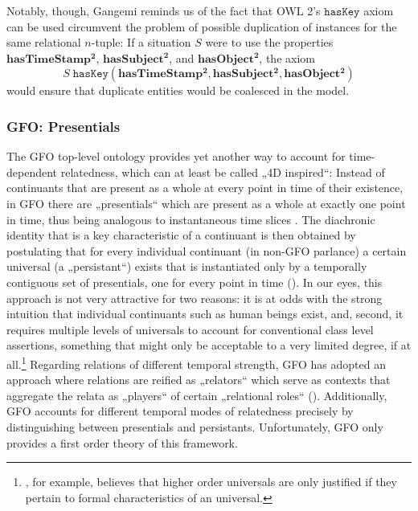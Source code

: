 \documentclass{ao2e}
\newcommand{\mirel}[1]{\ensuremath{\mathrm{\mathbf{#1}}}}
\newcommand{\mclass}[1]{\ensuremath{\mathit{#1}}}
\newcommand{\mrel}[2]{\mirel{#1^#2}}
\newcommand{\mrelb}[1]{\mrel{#1}{2}}
\begin{document}
Notably, though, Gangemi reminds us of the fact that OWL 2's $\mathtt{hasKey}$
axiom can be used circumvent the problem of possible duplication of instances
for the same relational $n$-tuple: If a situation $\mclass{S}$ were to use the properties
$\mrelb{hasTimeStamp}$, $\mrelb{hasSubject}$, and $\mrelb{hasObject}$, the axiom
\begin{equation}
\mclass{S}\;\mathtt{hasKey}(\mrelb{hasTimeStamp}, \mrelb{hasSubject},
\mrelb{hasObject})
\end{equation}
would ensure that duplicate entities would be coalesced in the model.

\subsubsection{GFO: Presentials}

The GFO top-level ontology provides yet another way to account for
time-dependent relatedness, which can at least be called „4D inspired“:
Instead of continuants that are present as a whole at every point in time
of their existence, in GFO there are „presentials“ which are present as a whole at
exactly one point in time, thus being analogous to instantaneous time slices
. The diachronic
identity that is a key characteristic of a continuant is then obtained by
postulating that for every individual continuant (in non-GFO parlance) a certain
universal (a „persistant“) exists that is instantiated only by a temporally
contiguous set of presentials, one for every point in time (\cite{GFO:ref}). In our eyes,
this approach is not very attractive for two reasons: it is at odds with the
strong intuition that individual continuants such as human beings exist, and,
second, it requires multiple levels of universals to account for conventional
class level assertions, something that might only be acceptable to a very
limited degree, if at all.\footnote{\cite{Armstrong:USR}, for example, believes that
higher order universals are only justified if they pertain to formal
characteristics of an universal.}
Regarding relations of different temporal strength, GFO has adopted an approach
where relations are reified as „relators“ which serve as contexts that aggregate
the relata as „players“ of certain „relational roles“ (\cite{Loebe:2007}). Additionally, GFO
accounts for different temporal modes of relatedness precisely by distinguishing
between presentials and persistants. Unfortunately, GFO only provides a first
order theory of this framework.
\end{document}
